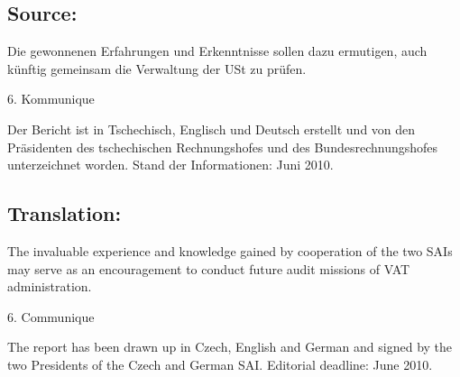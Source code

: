 \documentclass[10pt]{article}
\begin{document}
\subsection*{Source:}

Die gewonnenen Erfahrungen und Erkenntnisse sollen dazu ermutigen, auch künftig gemeinsam die Verwaltung der USt zu prüfen.


6. Kommunique

Der Bericht ist in Tschechisch, Englisch und Deutsch erstellt und von den Präsidenten des tschechischen Rechnungshofes und des Bundesrechnungshofes unterzeichnet worden.
Stand der Informationen: Juni 2010.


\pagebreak

\subsection*{Translation:}

The invaluable experience and knowledge gained by cooperation of the two SAIs may serve as an encouragement to conduct future audit missions of VAT administration.


6. Communique

The report has been drawn up in Czech, English and German and signed by the two Presidents of the Czech and German SAI.
Editorial deadline: June 2010.
\end{document}
